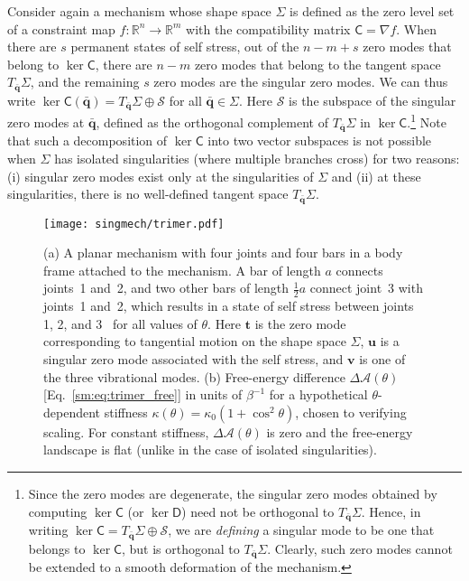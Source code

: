 Consider again a mechanism whose shape space $\Sigma$ is defined as the zero level set of a constraint map $f: \mathbb{R}^{n} \to \mathbb{R}^{m}$ with the compatibility matrix $\mathsf{C} = \nabla f$.
When there are $s$ permanent states of self stress, out of the $n - m + s$ zero modes that belong to $\ker\mathsf{C}$, there are $n-m$ zero modes that belong to the tangent space $T_{\bar{\bm{q}}}\Sigma$, and the remaining $s$ zero modes are the singular zero modes.
We can thus write $\ker\mathsf{C}(\bar{\bm{q}}) = T_{\bar{\bm{q}}}\Sigma \oplus \mathscr{S}$ for all $\bar{\bm{q}} \in \Sigma$.
Here $\mathscr{S}$ is the subspace of the singular zero modes at $\bar{\bm{q}}$, defined as the orthogonal complement of $T_{\bar{\bm{q}}}\Sigma$ in $\ker\mathsf{C}$.\footnote{Since the zero modes are degenerate, the singular zero modes obtained by computing $\ker\mathsf{C}$ (or $\ker\mathsf{D}$) need not be orthogonal to $T_{\bar{\bm{q}}}\Sigma$.  Hence, in writing $\ker\mathsf{C} = T_{\bar{\bm{q}}}\Sigma \oplus \mathscr{S}$, we are \emph{defining} a singular mode to be one that belongs to $\ker\mathsf{C}$, but is orthogonal to $T_{\bar{\bm{q}}}\Sigma$. Clearly, such zero modes cannot be extended to a smooth deformation of the mechanism.}
Note that such a decomposition of $\ker\mathsf{C}$ into two vector subspaces is not possible when $\Sigma$ has isolated singularities (where multiple branches cross) for two reasons: (i) singular zero modes exist only at the singularities of $\Sigma$ and (ii) at these singularities, there is no well-defined tangent space $T_{\bar{\bm{q}}}\Sigma$.
%
\begin{figure}
  \begin{center}
    \texttt{[image: singmech/trimer.pdf]}
  \end{center}
  \caption{(a) A planar mechanism with four joints and four bars in a body frame attached to the mechanism.  A bar of length $a$ connects joints~1 and~2, and two other bars of length $\frac{1}{2}a$ connect joint~3 with joints~1 and~2, which results in a state of self stress between joints 1, 2, and 3~\cite{calladine1978} for all values of $\theta$. Here $\bm{t}$ is the zero mode corresponding to tangential motion on the shape space $\Sigma$, $\bm{u}$ is a singular zero mode associated with the self stress, and $\bm{v}$ is one of the three vibrational modes.  (b) Free-energy difference $\Delta\mathscr{A}(\theta)$ [Eq.~\eqref{sm:eq:trimer_free}] in units of $\beta^{-1}$ for a hypothetical $\theta$-dependent stiffness $\kappa(\theta) = \kappa_{0}(1 + \cos^{2}{\theta})$, chosen to verifying scaling. For constant stiffness, $\Delta\mathscr{A}(\theta)$ is zero and the free-energy landscape is flat (unlike in the case of isolated singularities).}
  \label{sm:fig:trimer}
\end{figure}

